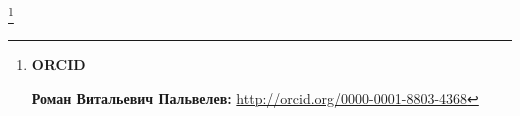 \thanks{{\bf ORCID}



{\bf Роман Витальевич Пальвелев:} \url{http://orcid.org/0000-0001-8803-4368}



}









\RusRef



